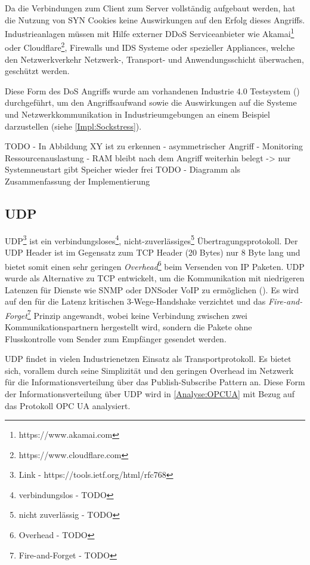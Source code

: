 Da die Verbindungen zum Client zum Server vollständig aufgebaut werden, hat die Nutzung von SYN Cookies keine Auswirkungen auf den Erfolg dieses Angriffs. Industrieanlagen müssen mit Hilfe externer \ac{DDoS} Serviceanbieter wie Akamai\footnote{https://www.akamai.com} oder Cloudflare\footnote{https://www.cloudflare.com}, Firewalls und \ac{IDS} Systeme oder spezieller Appliances, welche den Netzwerkverkehr Netzwerk-, Transport- und Anwendungsschicht überwachen, geschützt werden.

Diese Form des \ac{DoS} Angriffs wurde am vorhandenen Industrie 4.0 Testsystem (\cite{Weber2018}) durchgeführt, um den Angriffsaufwand sowie die Auswirkungen auf die Systeme und Netzwerkkommunikation in Industrieumgebungen an einem Beispiel darzustellen (siehe \autoref{Impl:Sockstress}). 

TODO - In Abbildung XY ist zu erkennen - asymmetrischer Angriff - Monitoring Ressourcenauslastung - RAM bleibt nach dem Angriff weiterhin belegt -> nur Systemneustart gibt Speicher wieder frei 
TODO - Diagramm als Zusammenfassung der Implementierung

\subsection{\ac{UDP}}
\ac{UDP}\footnote{Link - https://tools.ietf.org/html/rfc768} ist ein verbindungsloses\footnote{verbindungslos - TODO}, nicht-zuverlässiges\footnote{nicht zuverlässig - TODO} Übertragungsprotokoll. Der \ac{UDP} Header ist im Gegensatz zum \ac{TCP} Header (20 Bytes) nur 8 Byte lang und bietet somit einen sehr geringen \textit{Overhead}\footnote{Overhead - TODO} beim Versenden von \ac{IP} Paketen. \ac{UDP} wurde als Alternative zu \ac{TCP} entwickelt, um die Kommunikation mit niedrigeren Latenzen für Dienste wie \ac{SNMP} oder \ac{DNS}oder \ac{VoIP} zu ermöglichen (\cite{UDP2003}). Es wird auf den für die Latenz kritischen 3-Wege-Handshake verzichtet und das \textit{Fire-and-Forget}\footnote{Fire-and-Forget - TODO} Prinzip angewandt, wobei keine Verbindung zwischen zwei Kommunikationspartnern hergestellt wird, sondern die Pakete ohne Flusskontrolle vom Sender zum Empfänger gesendet werden.

\ac{UDP} findet in vielen Industrienetzen Einsatz als Transportprotokoll. Es bietet sich, vorallem durch seine Simplizität und den geringen Overhead im Netzwerk für die Informationsverteilung über das Publish-Subscribe Pattern an. Diese Form der Informationsverteilung über \ac{UDP} wird in \autoref{Analyse:OPCUA} mit Bezug auf das Protokoll \ac{OPC UA} analysiert.

